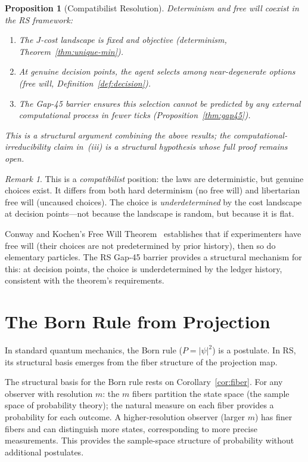 \documentclass[12pt,a4paper]{article}
\newtheorem{proposition}[theorem]{Proposition}
\theoremstyle{definition}
\theoremstyle{remark}
\newtheorem{remark}[theorem]{Remark}
\begin{document}
\begin{proposition}[Compatibilist Resolution]
\label{thm:compat}
Determinism and free will coexist in the RS framework:
\begin{enumerate}[label=(\roman*)]
  \item The $J$-cost landscape is fixed and objective (determinism,
  Theorem~\ref{thm:unique-min}).
  \item At genuine decision points, the agent selects among
    near-degenerate options (free will, Definition~\ref{def:decision}).
  \item The Gap-45 barrier ensures this selection cannot be predicted
    by any external computational process in fewer ticks
    (Proposition~\ref{thm:gap45}).
\end{enumerate}
This is a structural argument combining the above results; the
computational-irreducibility claim in~(iii) is a structural hypothesis
whose full proof remains open.
\end{proposition}

\begin{remark}
This is a \emph{compatibilist} position: the laws are deterministic, but
genuine choices exist.  It differs from both hard determinism (no free will)
and libertarian free will (uncaused choices).  The choice is
\emph{underdetermined} by the cost landscape at decision points---not
because the landscape is random, but because it is flat.

Conway and Kochen's Free Will Theorem~\cite{Conway2006} establishes that
if experimenters have free will (their choices are not predetermined by
prior history), then so do elementary particles.  The RS Gap-45 barrier
provides a structural mechanism for this: at decision points, the choice
is underdetermined by the ledger history, consistent with the theorem's
requirements.
\end{remark}

\section{The Born Rule from Projection}
\label{sec:born}

In standard quantum mechanics, the Born rule ($P = |\psi|^2$) is a
postulate.  In RS, its structural basis emerges from the fiber structure
of the projection map.

The structural basis for the Born rule rests on Corollary~\ref{cor:fiber}.
For any observer with resolution $m$: the $m$ fibers partition the state
space (the sample space of probability theory); the natural measure on
each fiber provides a probability for each outcome.  A higher-resolution
observer (larger $m$) has finer fibers and can distinguish more states,
corresponding to more precise measurements.  This provides the
sample-space structure of probability without additional postulates.
\end{document}
